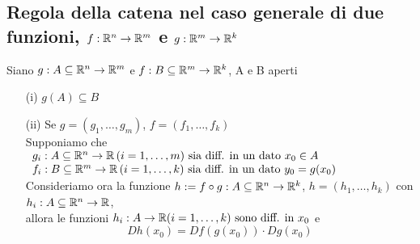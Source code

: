 \subsection{Regola della catena nel caso generale di due funzioni, 
$f:\mathbb{R}^n \to \mathbb{R}^m$ e $g:\mathbb{R}^m\to\mathbb{R}^k$}
\begin{theorem}
  Siano $g: A \subseteq \mathbb{R}^n\to \mathbb{R}^m$ e $f : B \subseteq \mathbb{R}^m \to \mathbb{R}^k$, A e B aperti
  \begin{enumerate}
    \item[(i)] $g(A) \subseteq B$
    \item[(ii)] Se $g = (g_1, \dots, g_m)$, $f = (f_1, \dots, f_k)$ \\
              Supponiamo che  $\begin{array}{l}
                g_i : A \subseteq \mathbb{R}^n \to \mathbb{R} \, (i = 1,\dots,m) \text{ sia diff. in un dato } x_0 \in A \\
                f_i : B \subseteq \mathbb{R}^m \to \mathbb{R} \, (i = 1,\dots,k) \text{ sia diff. in un dato } y_0 = g(x_0) \\ 
              \end{array}$ \\
              Consideriamo ora la funzione $h:= f \circ g : A \subseteq \mathbb{R}^n \to \mathbb{R}^k$, $h = (h_1, \dots, h_k)$
              con $h_i : A \subseteq \mathbb{R}^n \to \mathbb{R}$, \\ allora le funzioni 
              $h_i : A \to \mathbb{R} (i = 1,\dots,k) \text{ sono diff. in } x_0$ e 
              $$D h(x_0) = D f(g(x_0)) \cdot D g(x_0)$$
  \end{enumerate}
\end{theorem}